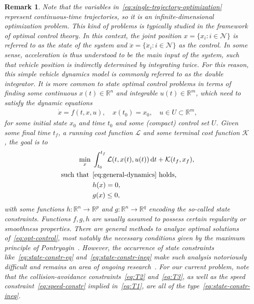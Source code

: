 \documentclass[a4paper]{report}
\theoremstyle{definition}
\theoremstyle{plain}
\newtheorem{remark}{Remark}[chapter]
\newcommand*\diff{\mathop{}\!\mathrm{d}}
\begin{document}
\begin{remark}\label{rem:state-constraints}
  Note that the variables in~\eqref{eq:single-trajectory-optimization} represent
  continuous-time trajectories, so it is an infinite-dimensional optimization
  problem.
  This kind of problems is typically studied in the framework of optimal control theory.
  In this context, the joint position $x = \{x_{i} : i \in \mathcal{N}\}$ is
  referred to as the \emph{state} of the system and
  $\ddot{x} = \{\ddot{x}_{i} : i \in \mathcal{N} \}$ as the \emph{control}.
  In some sense, acceleration is thus understood to be the main input of the system, such that
  vehicle position is indirectly determined by integrating twice. For this reason,
  this simple vehicle dynamics model is commonly referred to as the \emph{double integrator}.
  It is more common to state optimal control problems in terms of finding some
  continuous $x(t) \in \mathbb{R}^{n}$ and integrable $u(t) \in \mathbb{R}^{m}$,
  which need to satisfy the dynamic equations
  \begin{align}\label{eq:general-dynamics}
    \dot{x} = f(t, x, u) , \quad x(t_{0}) = x_{0} , \quad u \in U \subset \mathbb{R}^{m},
  \end{align}
  for some initial state $x_{0}$ and time $t_{0}$ and some (compact) control set
  $U$. Given some final time $t_{f}$, a running cost function $\mathcal{L}$ and
  some terminal cost function $\mathcal{K}$, the goal is to
  \begin{subequations}\label{eq:opt-control}
  \begin{align}
    \min_{x} \; & \int_{t_{0}}^{t_{f}} \mathcal{L}(t, x(t), u(t)) \diff t + \mathcal{K}(t_{f}, x_{f}) , \\
      \textnormal{such that } \, &\eqref{eq:general-dynamics} \textnormal{ holds, } \\
                    & h(x) = 0 , \label{eq:state-constr-eq} \\
                    & g(x) \leq 0 , \label{eq:state-constr-ineq}
  \end{align}
  \end{subequations}
  with some functions $h : \mathbb{R}^{n} \rightarrow \mathbb{R}^{p}$ and
  $g : \mathbb{R}^{n} \rightarrow \mathbb{R}^{q}$ encoding the so-called state
  constraints. Functions $f, g, h$ are usually assumed to possess certain
  regularity or smoothness properties.
  There are general methods to analyze optimal solutions
  of~\eqref{eq:opt-control}, most notably the necessary conditions given by the
  maximum principle of Pontryagin~\cite{liberzonCalculusVariationsOptimal}.
  However, the occurrence of state constraints like~\eqref{eq:state-constr-eq}
  and~\eqref{eq:state-constr-ineq} make such analysis notoriously difficult and
  remains an area of ongoing research~\cite{hartlSurveyMaximumPrinciples1995}.
  For our current problem, note that the collision-avoidance
  constraints~\eqref{eq:T2} and~\eqref{eq:T3}, as well as the speed
  constraint~\eqref{eq:speed-constr} implied in~\eqref{eq:T1}, are all of the
  type~\eqref{eq:state-constr-ineq}.
\end{remark}
\end{document}
